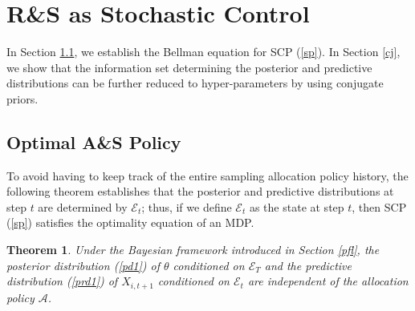 \documentclass[journal]{IEEEtran}
\newtheorem{theorem}{Theorem}
\begin{document}
\section{ R\&S as Stochastic Control}\label{sc}
In Section \ref{as}, we establish the Bellman equation for SCP (\ref{sp}). In Section \ref{cj}, we show that the information set determining the posterior and predictive distributions can be further reduced to hyper-parameters by using conjugate priors.
 \subsection{Optimal A\&S Policy}\label{as}
 To avoid having to keep track of the entire sampling allocation policy history, the following theorem establishes that the posterior and predictive distributions at step $t$ are determined by 
 $\mathcal{E}_t$; thus, if we define  $\mathcal{E}_t$ as the state at step $t$, then SCP (\ref{sp}) satisfies the optimality equation of an MDP. 
 \begin{theorem}\label{thm1} Under the Bayesian framework introduced in Section \ref{pfl}, 
  the posterior distribution (\ref{pd1}) of $\theta$ conditioned on $\mathcal{E}_T$ and the predictive distribution (\ref{prd1}) of $X_{i,t+1}$ conditioned on $\mathcal{E}_t$  are independent of the allocation policy $\mathcal{A}$. 
 \end{theorem}
\end{document}
